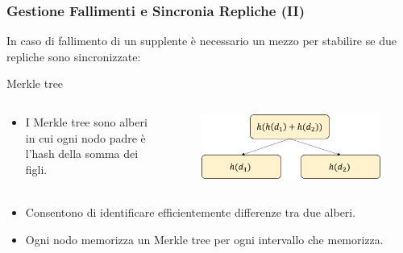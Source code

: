 \begin{frame}
  \frametitle{Gestione Fallimenti e Sincronia Repliche (II)}
    In caso di fallimento di un supplente è necessario un mezzo per stabilire se due repliche sono sincronizzate:
    \begin{block}{Merkle tree}
    \begin{columns}
    \begin{column}{0.4\textwidth}
      \begin{itemize}
      \item I \alert{Merkle tree} sono alberi in cui ogni nodo padre è l'hash della somma dei figli.
      \end{itemize}
      \end{column}
      \begin{column}{0.5\textwidth}
        \begin{figure}
        \centering
        \includegraphics[scale=0.4]{dynamo/merkle-tree.png}
        \end{figure}
      \end{column}
    \end{columns}
    \begin{itemize}
      \item Consentono di identificare efficientemente differenze tra due alberi.
      \item Ogni nodo memorizza un Merkle tree per ogni intervallo che memorizza.
    \end{itemize}
  \end{block}
\end{frame}


